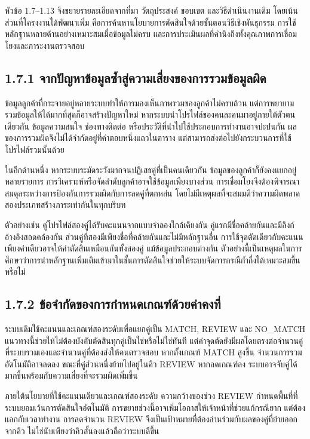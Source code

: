\documentclass[12pt,a4paper]{report}
\begin{document}
หัวข้อ 1.7--1.13 จึงขยายรายละเอียดจากที่มา วัตถุประสงค์ ขอบเขต และวิธีดำเนินงานเดิม โดยเน้นส่วนที่โครงงานได้พัฒนาเพิ่ม คือการค้นหานโยบายการตัดสินใจด้วยขั้นตอนวิธีเชิงพันธุกรรม การใช้หลักฐานหลายด้านอย่างเหมาะสมเมื่อข้อมูลไม่ครบ และการประเมินผลที่คำนึงถึงทั้งคุณภาพการเชื่อมโยงและภาระงานตรวจสอบ

\subsection*{1.7.1 จากปัญหาข้อมูลซ้ำสู่ความเสี่ยงของการรวมข้อมูลผิด}
ข้อมูลลูกค้าที่กระจายอยู่หลายระบบทำให้การมองเห็นภาพรวมของลูกค้าไม่ครบถ้วน แต่การพยายามรวมข้อมูลให้ได้มากที่สุดก็อาจสร้างปัญหาใหม่ หากระบบนำโปรไฟล์ของคนละคนมาอยู่ภายใต้ตัวตนเดียวกัน ข้อมูลความสนใจ ช่องทางติดต่อ หรือประวัติที่นำไปใช้ประกอบการทำงานอาจปะปนกัน ผลของการรวมผิดจึงไม่ได้จำกัดอยู่ที่คำตอบหนึ่งแถวในตาราง แต่สามารถส่งต่อไปยังกระบวนการที่ใช้โปรไฟล์รวมนั้นด้วย

ในอีกด้านหนึ่ง หากระบบระมัดระวังมากจนปฏิเสธคู่ที่เป็นคนเดียวกัน ข้อมูลของลูกค้าก็ยังคงแยกอยู่หลายรายการ การวิเคราะห์หรือจัดลำดับลูกค้าอาจใช้ข้อมูลเพียงบางส่วน การเชื่อมโยงจึงต้องพิจารณาสมดุลระหว่างการป้องกันการรวมผิดกับการลดคู่ที่ตกหล่น โดยไม่มีเหตุผลที่จะสมมติว่าความผิดพลาดสองประเภทสร้างภาระเท่ากันในทุกบริบท

ตัวอย่างเช่น คู่โปรไฟล์สองคู่ได้รับคะแนนจากแบบจำลองใกล้เคียงกัน คู่แรกมีชื่อคล้ายกันและมีลิงก์อ้างอิงสอดคล้องกัน ส่วนคู่ที่สองมีเพียงชื่อที่คล้ายกันและไม่มีหลักฐานอื่น การใช้จุดตัดเดียวกับคะแนนเพียงค่าเดียวอาจให้คำตัดสินเหมือนกันทั้งสองคู่ แม้ข้อมูลประกอบต่างกัน ตัวอย่างนี้เป็นเหตุผลในการศึกษาว่าการนำหลักฐานเพิ่มเติมเข้ามาในชั้นการตัดสินใจช่วยให้ระบบจัดการกรณีก้ำกึ่งได้เหมาะสมขึ้นหรือไม่

\subsection*{1.7.2 ข้อจำกัดของการกำหนดเกณฑ์ด้วยค่าคงที่}
ระบบเดิมใช้คะแนนและเกณฑ์สองระดับเพื่อแยกคู่เป็น MATCH, REVIEW และ NO\_MATCH แนวทางนี้ช่วยให้ไม่ต้องบังคับตัดสินทุกคู่เป็นใช่หรือไม่ใช่ทันที แต่ค่าจุดตัดยังมีผลโดยตรงต่อจำนวนคู่ที่ระบบรวมเองและจำนวนคู่ที่ต้องส่งให้คนตรวจสอบ หากตั้งเกณฑ์ MATCH สูงขึ้น จำนวนการรวมอัตโนมัติอาจลดลง ขณะที่คู่ส่วนหนึ่งย้ายไปอยู่ในคิว REVIEW หากลดเกณฑ์ลง ระบบอาจจับคู่ได้มากขึ้นพร้อมกับความเสี่ยงที่จะรวมผิดเพิ่มขึ้น

ภายใต้นโยบายที่ใช้คะแนนเดียวและเกณฑ์สองระดับ ความกว้างของช่วง REVIEW กำหนดพื้นที่ที่ระบบยอมเว้นการตัดสินใจอัตโนมัติ การขยายช่วงนี้อาจเพิ่มโอกาสให้เจ้าหน้าที่ช่วยแก้กรณียาก แต่ต้องแลกกับเวลาทำงาน การลดจำนวน REVIEW จึงเป็นเป้าหมายที่ต้องอ่านร่วมกับผลของคู่ที่ย้ายออกจากคิว ไม่ใช่นับเพียงว่าคิวสั้นลงแล้วถือว่าระบบดีขึ้น
\end{document}
